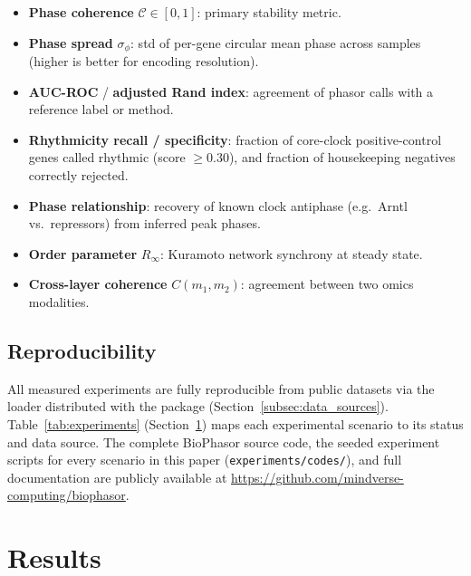 \documentclass[preprint,12pt,amsmath,amssymb,superscriptaddress,floatfix]{revtex4-2}
\begin{document}
\begin{itemize}
    \item \textbf{Phase coherence} $\mathcal{C} \in [0,1]$: primary stability metric.
    \item \textbf{Phase spread} $\sigma_\phi$: std of per-gene circular mean
    phase across samples (higher is better for encoding resolution).
    \item \textbf{AUC-ROC} / \textbf{adjusted Rand index}: agreement of
    phasor calls with a reference label or method.
    \item \textbf{Rhythmicity recall / specificity}: fraction of core-clock
    positive-control genes called rhythmic (score $\geq 0.30$), and fraction
    of housekeeping negatives correctly rejected.
    \item \textbf{Phase relationship}: recovery of known clock antiphase
    (e.g.\ Arntl vs.\ repressors) from inferred peak phases.
    \item \textbf{Order parameter} $R_\infty$: Kuramoto network synchrony at steady state.
    \item \textbf{Cross-layer coherence} $C(m_1,m_2)$: agreement between
    two omics modalities.
\end{itemize}

\subsection{Reproducibility}
\label{subsec:reproducible}

All measured experiments are fully reproducible from public datasets via the
loader distributed with the package (Section~\ref{subsec:data_sources}).
Table~\ref{tab:experiments} (Section~\ref{sec:results}) maps each
experimental scenario to its status and data source.
The complete BioPhasor source code, the seeded experiment scripts for every
scenario in this paper (\texttt{experiments/codes/}), and full documentation are
publicly available at \url{https://github.com/mindverse-computing/biophasor}.

\section{Results}
\label{sec:results}
\end{document}
